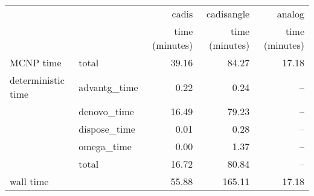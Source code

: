 \begin{tabular}{llrrr}
\toprule
          &              &          cadis &     cadisangle &         analog \\
          &              & time (minutes) & time (minutes) & time (minutes) \\
\midrule
MCNP time & total &          39.16 &          84.27 &          17.18 \\
deterministic time & advantg\_time &           0.22 &           0.24 &            -- \\
          & denovo\_time &          16.49 &          79.23 &            -- \\
          & dispose\_time &           0.01 &           0.28 &            -- \\
          & omega\_time &           0.00 &           1.37 &            -- \\
          & total &          16.72 &          80.84 &            -- \\
wall time &              &          55.88 &         165.11 &          17.18 \\
\bottomrule
\end{tabular}
